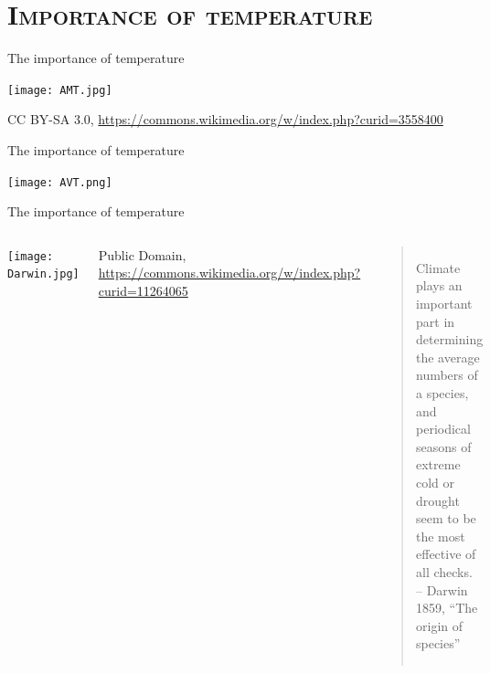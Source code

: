 \section{\scshape Importance of temperature}

\begin{frame}{The importance of temperature}

\begin{center}
  \texttt{[image: AMT.jpg]}\\
    {\tiny CC BY-SA 3.0, \url{https://commons.wikimedia.org/w/index.php?curid=3558400}\par}
 \end{center}
  
\end{frame}

\begin{frame}{The importance of temperature}

  \begin{center}
    \texttt{[image: AVT.png]}\\
   \end{center}
    
  \end{frame}

\begin{frame}{The importance of temperature}

\begin{columns}[c]
    \centering
      \vspace*{\fill} 
      \texttt{[image: Darwin.jpg]}\\
      {\tiny Public Domain, \url{https://commons.wikimedia.org/w/index.php?curid=11264065} \par} 
      \vspace*{\fill}
    \vspace*{\fill} 
    \begin{quote} 
      Climate plays an important part in determining the average numbers 
      of a species, and periodical seasons of extreme cold or drought seem 
      to be the most effective of all checks.\\
      \centering 
      \hfill -- {\small Darwin 1859, ``The origin of species''}
    \end{quote}
    \vspace*{\fill}
  \end{columns}

\end{frame}


